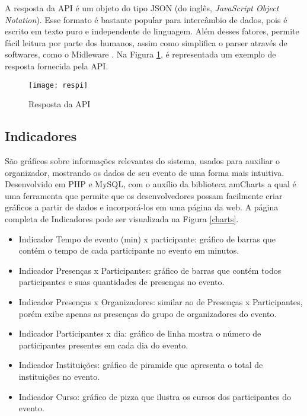 \documentclass[tcc,capa]{texufpel}
\begin{document}
            A resposta da API é um objeto do tipo JSON (do inglês, \textit{JavaScript Object Notation}).
            Esse formato é bastante popular para intercâmbio de dados, pois é escrito em texto puro e independente de linguagem. Além desses fatores, permite fácil leitura por parte dos humanos, assim como simplifica o parser através de softwares, como o Midleware \cite{crockford2006application}. Na Figura \ref{respapi}, é representada um exemplo de resposta fornecida pela API.
            
            \begin{figure}[H]
                \centering \texttt{[image: respi]}
                \caption{Resposta da API} 
                \label{respapi}
            \end{figure}
    
    
        \subsection{Indicadores}
        
        São gráficos sobre informações relevantes do sistema, usados para auxiliar o organizador, mostrando os dados de seu evento de uma forma mais intuitiva.
        Desenvolvido em PHP e MySQL, com o auxílio da biblioteca amCharts \cite{Am:2015:Online} a qual é uma ferramenta que permite que os desenvolvedores possam facilmente criar gráficos a partir de dados e incorporá-los em uma página da web. A página completa de Indicadores pode ser visualizada na Figura \ref{charts}. 
        
        \begin{itemize}
             \item Indicador Tempo de evento (min) x participante: gráfico de barras que contém o tempo de cada participante no evento em minutos.
             
            \item Indicador Presenças x Participantes: gráfico de barras que contém todos participantes e suas quantidades de presenças no evento.
            
            \item Indicador Presenças x Organizadores: similar ao de Presenças x Participantes, porém exibe apenas as presenças do grupo de organizadores do evento.
            
            
            
            \item Indicador Participantes x dia: gráfico de linha mostra o número de participantes presentes em cada dia do evento.
            
            \item Indicador Instituições: gráfico de piramide que apresenta o total de instituições no evento.
            
            \item Indicador Curso: gráfico de pizza que ilustra os cursos dos participantes do evento.
            
            
        \end{itemize}
        
\end{document}
